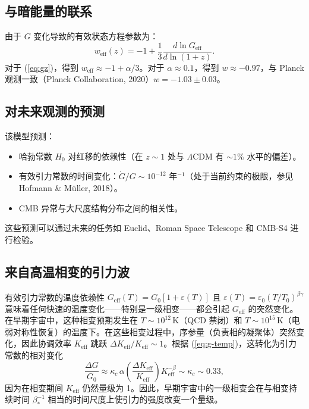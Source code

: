 \documentclass[12pt]{article}
\theoremstyle{remark}
\newcommand{\Keff}{K_{\mathrm{eff}}}
\newcommand{\eps}{\varepsilon}
\begin{document}
	\subsection{与暗能量的联系}
	\label{subsec:cosmo-de}
	
	由于 $G$ 变化导致的有效状态方程参数为：
	\begin{equation}
		w_{\text{eff}}(z) = -1 + \frac{1}{3} \frac{d \ln G_{\text{eff}}}{d \ln(1+z)}.
		\label{eq:weff}
	\end{equation}
	对于 (\ref{eq:gz})，得到 $w_{\text{eff}} \approx -1 + \alpha/3$。对于 $\alpha \approx 0.1$，得到 $w \approx -0.97$，与 Planck 观测一致（Planck Collaboration, 2020）$w = -1.03 \pm 0.03$。
	
	\subsection{对未来观测的预测}
	\label{subsec:cosmo-predictions}
	
	该模型预测：
	\begin{itemize}
		\item 哈勃常数 $H_0$ 对红移的依赖性（在 $z\sim 1$ 处与 $\Lambda$CDM 有 $\sim 1\%$ 水平的偏差）。
		\item 有效引力常数的时间变化：$\dot{G}/G \sim 10^{-12}$ 年$^{-1}$（处于当前约束的极限，参见 Hofmann \& Müller, 2018）。
		\item CMB 异常与大尺度结构分布之间的相关性。
	\end{itemize}
	这些预测可以通过未来的任务如 Euclid、Roman Space Telescope 和 CMB-S4 进行检验。
	
	\subsection{来自高温相变的引力波}
	\label{subsec:gw}
	
	有效引力常数的温度依赖性 $G_{\mathrm{eff}}(T)=G_0[1+\eps(T)]$ 且 $\eps(T)=\eps_0(T/T_0)^{\beta\gamma}$ 意味着任何快速的温度变化——特别是一级相变——都会引起 $G_{\mathrm{eff}}$ 的突然变化。在早期宇宙中，这种相变预期发生在 $T\sim 10^{12}\,\mathrm{K}$（QCD 禁闭）和 $T\sim 10^{15}\,\mathrm{K}$（电弱对称性恢复）的温度下。在这些相变过程中，序参量（负责相的凝聚体）突然变化，因此协调效率 $\Keff$ 跳跃 $\Delta\Keff/\Keff\sim 1$。根据 (\ref{eq:g-temp})，这转化为引力常数的相对变化
	\begin{equation}
		\frac{\Delta G}{G_0} \approx \kappa_c\,\alpha \left(\frac{\Delta\Keff}{\Keff}\right) 
		\Keff^{-\beta} \sim \kappa_c \sim 0.33,
		\label{eq:deltaG-phase}
	\end{equation}
	因为在相变期间 $\Keff$ 仍然量级为 1。因此，早期宇宙中的一级相变会在与相变持续时间 $\beta_*^{-1}$ 相当的时间尺度上使引力的强度改变一个量级。
	
\end{document}
